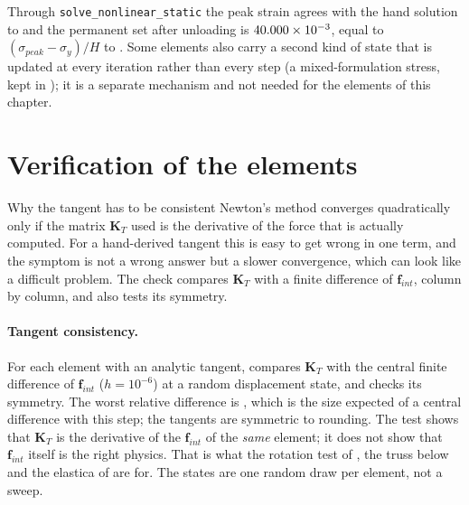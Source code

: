 Through \texttt{solve\_nonlinear\_static} the peak strain agrees with the hand solution to \cnlFesPeakErr and the permanent set after unloading is $40.000\times10^{-3}$, equal to $(\sigma_{peak}-\sigma_y)/H$ to \cnlFesSetErr. Some elements also carry a second kind of state that is updated at every iteration rather than every step (a mixed-formulation stress, kept in ); it is a separate mechanism and not needed for the elements of this chapter.

\section{Verification of the elements}\label{sec:nl-verif}

\begin{sidenote}{Why the tangent has to be consistent}
Newton's method converges quadratically only if the matrix $\bm K_T$ used is the derivative of the force that is actually computed. For a hand-derived tangent this is easy to get wrong in one term, and the symptom is not a wrong answer but a slower convergence, which can look like a difficult problem. The check compares $\bm K_T$ with a finite difference of $\bm f_{int}$, column by column, and also tests its symmetry.
\end{sidenote}

\paragraph{Tangent consistency.}
For each element with an analytic tangent,  compares $\bm K_T$ with the central finite difference of $\bm f_{int}$ ($h=10^{-6}$) at a random displacement state, and checks its symmetry. The worst relative difference is \cnlTangentWorst, which is the size expected of a central difference with this step; the tangents are symmetric to rounding. The test shows that $\bm K_T$ is the derivative of the $\bm f_{int}$ of the \emph{same} element; it does not show that $\bm f_{int}$ itself is the right physics. That is what the rotation test of , the truss below and the elastica of  are for. The states are one random draw per element, not a sweep.

\begin{table}[ht]
\centering\small

\caption{Analytic tangent against central finite differences of the internal force, one random displacement state per element.}\label{tab:nl-tangent}
\end{table}

